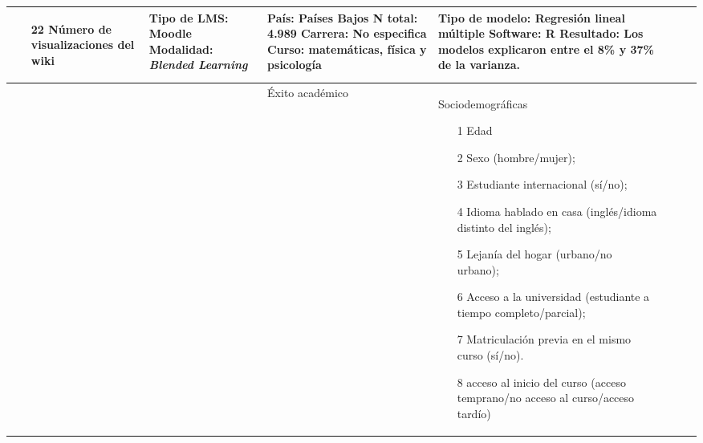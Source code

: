 \documentclass[spanish]{textolivre}
\begin{document}
\begin{small}
\begin{longtable}{
    >{\raggedright\arraybackslash}p{}
    p{}
    p{}
    p{}
    p{}
    p{}
    p{}
    }
\begin{itemize}
\item[22] Número de visualizaciones del wiki
\end{itemize}	& Tipo de LMS: Moodle \newline Modalidad:
\emph{Blended Learning} & País: Países Bajos \newline N total: 4.989 \newline Carrera: No especifica \newline Curso: matemáticas, física y psicología & Tipo de modelo: Regresión lineal múltiple \newline Software: R \newline Resultado: Los modelos explicaron entre el 8\% y 37\% de la varianza.
\endfirsthead
\\
\midrule
2 & \cite{gasevic2016} & Éxito académico & Sociodemográficas
\begin{itemize}
\item[1] Edad
\item[2] Sexo (hombre/mujer);
\item[3] Estudiante internacional (sí/no);
\item[4] Idioma hablado en casa (inglés/idioma distinto del inglés);
\item[5] Lejanía del hogar (urbano/no urbano);
\item[6] Acceso a la universidad (estudiante a tiempo completo/parcial);
\item[7] Matriculación previa en el mismo curso (sí/no).
\item[8] acceso al inicio del curso (acceso temprano/no acceso al curso/acceso tardío)
\end{itemize}


\end{longtable}
\end{small}
\end{document}
